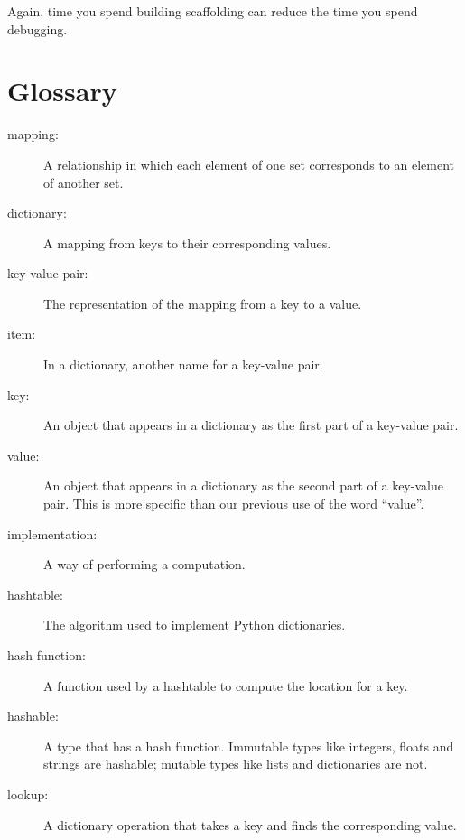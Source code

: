 \documentclass[10pt]{book}
\begin{document}
Again, time you spend building scaffolding can reduce
the time you spend debugging.


\section{Glossary}

\begin{description}

\item[mapping:] A relationship in which each element of one set
corresponds to an element of another set.

\item[dictionary:] A mapping from keys to their
corresponding values.

\item[key-value pair:] The representation of the mapping from
a key to a value.

\item[item:] In a dictionary, another name for a key-value
  pair.

\item[key:] An object that appears in a dictionary as the
first part of a key-value pair.

\item[value:] An object that appears in a dictionary as the
second part of a key-value pair.  This is more specific than
our previous use of the word ``value''.

\item[implementation:] A way of performing a computation.

\item[hashtable:] The algorithm used to implement Python
dictionaries.

\item[hash function:] A function used by a hashtable to compute the
location for a key.

\item[hashable:] A type that has a hash function.  Immutable
types like integers,
floats and strings are hashable; mutable types like lists and
dictionaries are not.

\item[lookup:] A dictionary operation that takes a key and finds
the corresponding value.


\end{description}
\end{document}
